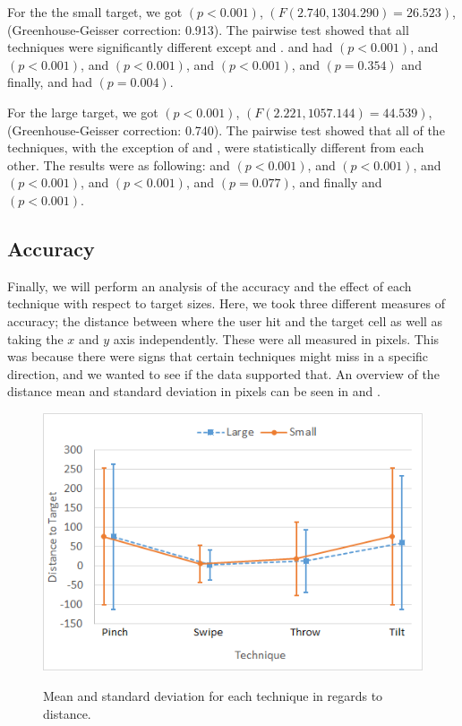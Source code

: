 For the the small target, we got $(p<0.001)$, $(F(2.740, 1304.290)=26.523)$, (Greenhouse-Geisser correction: 0.913).
The pairwise test showed that all techniques were significantly different except \swipe and \tilt. 
\pinch and \swipe had $(p < 0.001)$, 
\pinch and \throw $(p <0.001)$, 
\pinch and \tilt $(p < 0.001)$, 
\swipe and \throw $(p < 0.001)$, 
\swipe and \tilt $(p = 0.354)$ and finally, 
\throw and \tilt had $(p = 0.004)$. 

For the large target, we got $(p<0.001)$, $(F(2.221, 1057.144)=44.539)$, (Greenhouse-Geisser correction: 0.740).
The pairwise test showed that all of the techniques, with the exception of \swipe and \tilt, were statistically different from each other. The results were as following: 
\pinch and \swipe $(p<0.001)$, 
\pinch and \throw $(p<0.001)$, 
\pinch and \tilt $(p<0.001)$, 
\swipe and \throw $(p<0.001)$, 
\swipe and \tilt $(p=0.077)$, and finally 
\throw and \tilt $(p<0.001)$.

\subsection{Accuracy}
Finally, we will perform an analysis of the accuracy and the effect of each technique with respect to target sizes.
Here, we took three different measures of accuracy; the distance between where the user hit and the target cell as well as taking the $x$ and $y$ axis independently. 
These were all measured in pixels.
This was because there were signs that certain techniques might miss in a specific direction, and we wanted to see if the data supported that. 
An overview of the distance mean and standard deviation in pixels can be seen in  and .

\begin{figure}[H]
	{\includegraphics[width = 1\columnwidth ]{images/distance.png}} 
	\caption{
		Mean and standard deviation for each technique in regards to distance.
	}
	\label{fig:distanceResults}
\end{figure}

